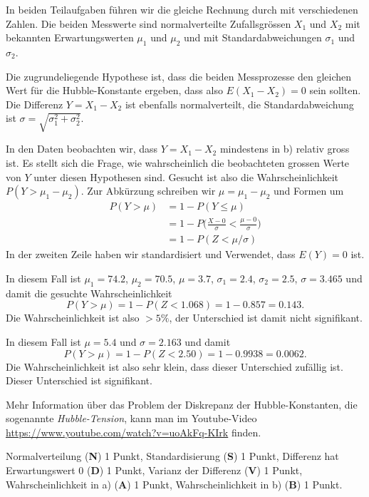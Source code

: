 \begin{loesung}
In beiden Teilaufgaben führen wir die gleiche Rechnung durch mit
verschiedenen Zahlen.
Die beiden Messwerte sind normalverteilte Zufallsgrössen $X_1$ und $X_2$ 
mit bekannten Erwartungswerten $\mu_1$ und $\mu_2$ und
mit Standardabweichungen $\sigma_1$ und $\sigma_2$.

Die zugrundeliegende Hypothese ist, dass die beiden Messprozesse den
gleichen Wert für die Hubble-Konstante ergeben, dass also 
$E(X_1-X_2)=0$ sein sollten.
Die Differenz $Y=X_1-X_2$ ist ebenfalls normalverteilt, die Standardabweichung
ist 
$\sigma=\sqrt{\sigma_1^2+\sigma_2^2}$.

In den Daten beobachten wir, dass $Y=X_1-X_2$ mindestens in b) relativ 
gross ist.
Es stellt sich die Frage, wie wahrscheinlich die beobachteten grossen Werte
von $Y$ unter diesen Hypothesen sind.
Gesucht ist also die Wahrscheinlichkeit $ P(Y > \mu_1-\mu_2).  $
Zur Abkürzung schreiben wir $\mu=\mu_1-\mu_2$ und Formen um
\begin{align*}
P(Y> \mu)
&=
1-P(Y\le \mu)
\\
&=
1-P\biggl(\frac{X-0}{\sigma} < \frac{\mu-0}{\sigma}\biggr)
\\
&=
1-P(Z < \mu/\sigma)
\end{align*}
In der zweiten Zeile haben wir standardisiert und Verwendet, dass
$E(Y)=0$ ist.
\begin{teilaufgaben}
\item
In diesem Fall ist $\mu_1=74.2$, $\mu_2=70.5$, $\mu=3.7$,
$\sigma_1=2.4$, $\sigma_2=2.5$, $\sigma=3.465$ und damit die
gesuchte Wahrscheinlichkeit
\[
P(Y>\mu)
=1-P(Z<1.068) = 1-0.857 = 0.143.
\]
Die Wahrscheinlichkeit ist also $>5\%$, der Unterschied ist damit
nicht signifikant.
\item
In diesem Fall ist $\mu = 5.4$ und $\sigma=2.163$ und damit
\[
P(Y>\mu)
=1-P(Z<2.50) = 1-0.9938 = 0.0062.
\]
Die Wahrscheinlichkeit ist also sehr klein, dass dieser Unterschied
zufällig ist.
Dieser Unterschied ist signifikant.
\qedhere
\end{teilaufgaben}
\end{loesung}

\begin{diskussion}
Mehr Information über das Problem der Diskrepanz der Hubble-Konstanten,
die sogenannte {\em Hubble-Tension}, kann man im
Youtube-Video \url{https://www.youtube.com/watch?v=uoAkFq-KIrk}
finden.
\end{diskussion}

\begin{bewertung}
Normalverteilung ({\bf N}) 1 Punkt,
Standardisierung ({\bf S}) 1 Punkt,
Differenz hat Erwartungswert 0 ({\bf D}) 1 Punkt,
Varianz der Differenz ({\bf V}) 1 Punkt,
Wahrscheinlichkeit in a) ({\bf A}) 1 Punkt,
Wahrscheinlichkeit in b) ({\bf B}) 1 Punkt.
\end{bewertung}
